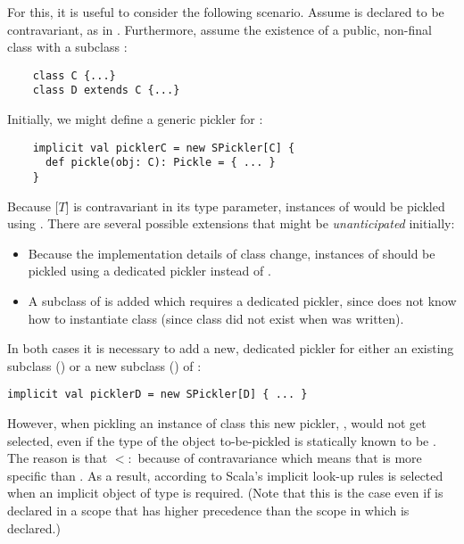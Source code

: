 For this, it is useful to consider the following scenario. Assume  is
declared to be contravariant, as in . Furthermore, assume
the existence of a public, non-final class  with a subclass :

\begin{lstlisting}
    class C {...}
    class D extends C {...}
\end{lstlisting}

Initially, we might define a generic pickler for :

\pagebreak

\begin{lstlisting}
    implicit val picklerC = new SPickler[C] {
      def pickle(obj: C): Pickle = { ... }
    }
\end{lstlisting}

Because [$T$] is contravariant in its type parameter, instances
of  would be pickled using . There are several possible
extensions that might be {\em unanticipated} initially:

\begin{itemize}
\item Because the implementation details of class  change, instances
of  should be pickled using a dedicated pickler instead of
.

\item A subclass  of  is added which requires a dedicated
pickler, since  does not know how to instantiate class 
(since class  did not exist when  was written).
\end{itemize}

In both cases it is necessary to add a new, dedicated pickler for either an
existing subclass () or a new subclass () of :

\begin{lstlisting}
implicit val picklerD = new SPickler[D] { ... }
\end{lstlisting}

However, when pickling an instance of class  this new pickler,
, would not get selected, even if the type of the object to-be-pickled
is statically known to be . The reason is that
 $<:$  because of contravariance which
means that  is more specific than . As a result,
according to Scala's implicit look-up rules  is selected when
an implicit object of type  is required. (Note that this
is the case even if  is declared in a scope that has higher
precedence than the scope in which  is declared.)

